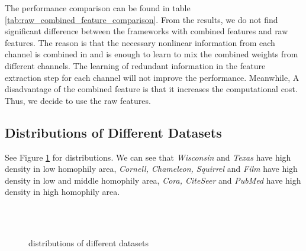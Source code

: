 \documentclass{article}
\newcommand{\0}{{\boldsymbol{0}}}
\newcommand{\6}{{\partial}}
\newcommand{\8}{{\infty}}
\newcommand{\4}{{\nabla}}
\begin{document}
The performance comparison can be found in table \ref{tab:raw_combined_feature_comparison}. From the results, we do not find significant difference between the frameworks with combined features and raw features. The reason is that the necessary nonlinear information from each channel is combined in  and  is enough to learn to mix the combined weights from different channels. The learning of redundant information in the feature extraction step for each channel will not improve the performance. Meanwhile, A disadvantage of the combined feature is that it increases the computational cost. Thus, we decide to use the raw features.
\subsection{ Distributions of Different Datasets}
See Figure \ref{fig:local_homo_distributions} for  distributions. We can see that \textit{Wisconsin} and \textit{Texas} have high density in low homophily area, \textit{Cornell, Chameleon, Squirrel} and \textit{Film} have high density in low and middle homophily area, \textit{Cora, CiteSeer} and \textit{PubMed} have high density in high homophily area.

\label{appendix:alpha_values_output}
\begin{figure}[H]
    \centering
     {
      \\
      \\
     }
     \caption{ distributions of different datasets}
     \label{fig:local_homo_distributions}
\end{figure}
\end{document}
